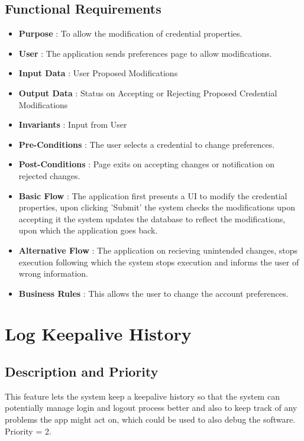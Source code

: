 \subsection{Functional Requirements}
\begin{itemize}
    \item \textbf{Purpose} : To allow the modification of credential properties.
    \item \textbf{User} : The application sends preferences page to allow modifications.
    \item \textbf{Input Data} : User Proposed Modifications
    \item \textbf{Output Data} : Status on Accepting or Rejecting Proposed Credential Modifications
    \item \textbf{Invariants} : Input from User
    \item \textbf{Pre-Conditions} : The user selects a credential to change preferences.
    \item \textbf{Post-Conditions} : Page exits on accepting changes or notification on rejected changes.
    \item \textbf{Basic Flow} : The application first presents a UI to modify the credential properties, upon clicking 'Submit' the system checks the modifications upon accepting it the system updates the database to reflect the modifications, upon which the application goes back.
    \item \textbf{Alternative Flow} : The application on recieving unintended changes, stops execution following which the system stops execution and informs the user of wrong information.
    \item \textbf{Business Rules} : This allows the user to change the account preferences.
\end{itemize}

\section{Log Keepalive History}
\subsection{Description and Priority}
This feature lets the system keep a keepalive history so that the system can potentially manage login and logout process better and also to keep track of any problems the app might act on, which could be used to also debug the software.
Priority = 2.
